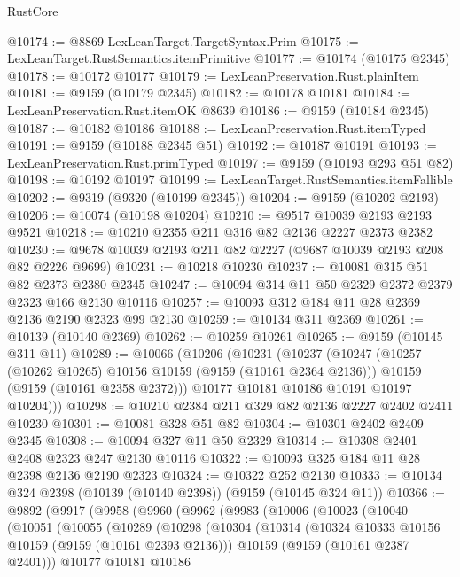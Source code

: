 \begin{lexlean}{RustCore}
\begin{coremodule}
@10174 := @8869 LexLeanTarget.TargetSyntax.Prim
@10175 := LexLeanTarget.RustSemantics.itemPrimitive
@10177 := @10174 (@10175 @2345)
@10178 := @10172 @10177
@10179 := LexLeanPreservation.Rust.plainItem
@10181 := @9159 (@10179 @2345)
@10182 := @10178 @10181
@10184 := LexLeanPreservation.Rust.itemOK @8639
@10186 := @9159 (@10184 @2345)
@10187 := @10182 @10186
@10188 := LexLeanPreservation.Rust.itemTyped
@10191 := @9159 (@10188 @2345 @51)
@10192 := @10187 @10191
@10193 := LexLeanPreservation.Rust.primTyped
@10197 := @9159 (@10193 @293 @51 @82)
@10198 := @10192 @10197
@10199 := LexLeanTarget.RustSemantics.itemFallible
@10202 := @9319 (@9320 (@10199 @2345))
@10204 := @9159 (@10202 @2193)
@10206 := @10074 (@10198 @10204)
@10210 := @9517 @10039 @2193 @2193 @9521
@10218 := @10210 @2355 @211 @316 @82 @2136 @2227 @2373 @2382
@10230 := @9678 @10039 @2193 @211 @82 @2227 (@9687 @10039 @2193 @208 @82 @2226 @9699)
@10231 := @10218 @10230
@10237 := @10081 @315 @51 @82 @2373 @2380 @2345
@10247 := @10094 @314 @11 @50 @2329 @2372 @2379 @2323 @166 @2130 @10116
@10257 := @10093 @312 @184 @11 @28 @2369 @2136 @2190 @2323 @99 @2130
@10259 := @10134 @311 @2369
@10261 := @10139 (@10140 @2369)
@10262 := @10259 @10261
@10265 := @9159 (@10145 @311 @11)
@10289 := @10066
    (@10206
      (@10231
        (@10237
          (@10247
            (@10257 (@10262 @10265) @10156 @10159 (@9159 (@10161 @2364 @2136)))
            @10159
            (@9159 (@10161 @2358 @2372)))
          @10177
          @10181
          @10186
          @10191
          @10197
          @10204)))
@10298 := @10210 @2384 @211 @329 @82 @2136 @2227 @2402 @2411 @10230
@10301 := @10081 @328 @51 @82
@10304 := @10301 @2402 @2409 @2345
@10308 := @10094 @327 @11 @50 @2329
@10314 := @10308 @2401 @2408 @2323 @247 @2130 @10116
@10322 := @10093 @325 @184 @11 @28 @2398 @2136 @2190 @2323
@10324 := @10322 @252 @2130
@10333 := @10134 @324 @2398 (@10139 (@10140 @2398)) (@9159 (@10145 @324 @11))
@10366 := @9892
    (@9917
      (@9958
        (@9960
          (@9962
            (@9983
              (@10006
                (@10023
                  (@10040
                    (@10051
                      (@10055
                        (@10289
                          (@10298
                            (@10304
                              (@10314
                                (@10324 @10333 @10156 @10159 (@9159 (@10161 @2393 @2136)))
                                @10159
                                (@9159 (@10161 @2387 @2401)))
                              @10177
                              @10181
                              @10186

\end{coremodule}
\end{lexlean}

